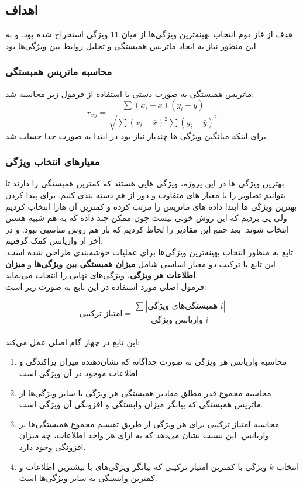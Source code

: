 \documentclass[a4paper,12pt]{article}
\begin{document}
\subsection*{\textbf{اهداف}}
هدف از فاز دوم انتخاب بهینه‌ترین ویژگی‌ها از میان 11 ویژگی استخراج شده بود. و به این منظور نیاز به ایجاد ماتریس همبستگی و تحلیل روابط بین ویژگی‌ها بود.

\subsubsection*{\textbf{محاسبه ماتریس همبستگی}}
ماتریس همبستگی به صورت دستی با استفاده از فرمول زیر محاسبه شد:
\begin{equation}
r_{xy} = \frac{\sum (x_i - \bar{x})(y_i - \bar{y})}{\sqrt{\sum (x_i - \bar{x})^2 \sum (y_i - \bar{y})^2}}
\end{equation}
برای اینکه میانگین ویژگی ها چندبار نیاز بود در ابتدا به صورت جدا حساب شد.

\subsubsection*{\textbf{معیارهای انتخاب ویژگی}}
بهترین ویژگی ها در این پروژه، ویژگی هایی هستند که کمترین همبستگی را دارند تا بتوانیم تصاویر را با معیار های متفاوت و دور از هم دسته بندی کنیم.
برای پیدا کردن بهترین ویژگی ها ابتدا داده های ماتریس را مرتب کرده و کمترین آن هارا انتخاب کردیم ولی پی بردیم که این روش خوبی نیست چون ممکن چند داده که به هم شبیه هستن انتخاب شوند. بعد جمع این مقادیر را لحاظ کردیم که باز هم روش مناسبی نبود. و در آخر از واریانس کمک گرفتیم.
\\
تابع  به منظور انتخاب بهینه‌ترین ویژگی‌ها برای عملیات خوشه‌بندی طراحی شده است. این تابع با ترکیب دو معیار اساسی شامل \textbf{میزان همبستگی بین ویژگی‌ها} و \textbf{میزان اطلاعات هر ویژگی}، ویژگی‌های نهایی را انتخاب می‌نماید.
\\
فرمول اصلی مورد استفاده در این تابع به صورت زیر است:

\begin{equation}
\text{امتیاز ترکیبی} = \frac{\sum|\text{همبستگی‌های ویژگی }i|}{\text{واریانس ویژگی }i}
\end{equation}
\\
این تابع در چهار گام اصلی عمل می‌کند:

\begin{enumerate}
\item محاسبه واریانس هر ویژگی به صورت جداگانه که نشان‌دهنده میزان پراکندگی و اطلاعات موجود در آن ویژگی است.

\item محاسبه مجموع قدر مطلق مقادیر همبستگی هر ویژگی با سایر ویژگی‌ها از ماتریس همبستگی که بیانگر میزان وابستگی و افزونگی آن ویژگی است.

\item محاسبه امتیاز ترکیبی برای هر ویژگی از طریق تقسیم مجموع همبستگی‌ها بر واریانس. این نسبت نشان می‌دهد که به ازای هر واحد اطلاعات، چه میزان افزونگی وجود دارد.

\item انتخاب $k$ ویژگی با کمترین امتیاز ترکیبی که بیانگر ویژگی‌های با بیشترین اطلاعات و کمترین وابستگی به سایر ویژگی‌ها است.
\end{enumerate}
\end{document}
